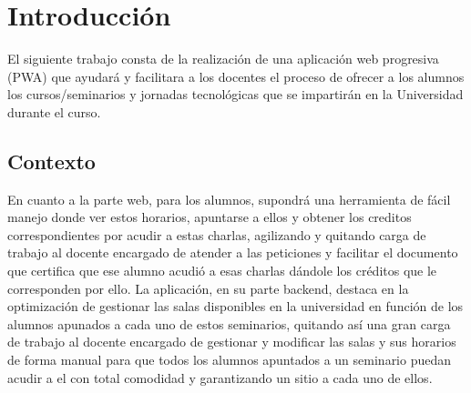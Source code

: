 \documentclass[a4paper, 12pt]{book}
\begin{document}


\tableofcontents 
\cleardoublepage
\listoffigures %



\cleardoublepage
\chapter{Introducción}
\label{sec:intro} %

El siguiente trabajo consta de la realización de una aplicación web progresiva (PWA) que ayudará y facilitara a los docentes el proceso de ofrecer a los alumnos los cursos/seminarios y jornadas tecnológicas que se impartirán en la Universidad durante el curso.


\section{Contexto}
\label{sec:contexto}

En cuanto a la parte web, para los alumnos, supondrá una herramienta de fácil manejo donde ver estos horarios, apuntarse a ellos y obtener los creditos correspondientes por acudir a estas charlas, agilizando y quitando carga de trabajo al docente encargado de atender a las peticiones y facilitar el documento que certifica que ese alumno acudió a esas charlas dándole los créditos que le corresponden por ello.
La aplicación, en su parte backend, destaca en la optimización de gestionar las salas disponibles en la universidad en función de los alumnos apunados a cada uno de estos seminarios, quitando así una gran carga de trabajo al docente encargado de gestionar y modificar las salas y sus horarios de forma manual para que todos los alumnos apuntados a un seminario puedan acudir a el con total comodidad y garantizando un sitio a cada uno de ellos.
\end{document}
